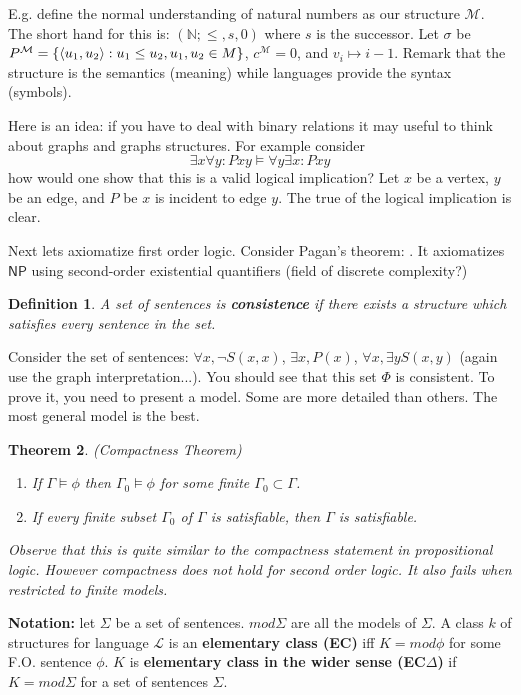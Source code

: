 \documentclass[twoside]{article}
\newcounter{lecnum}
\newtheorem{theorem}{Theorem}[lecnum]
\newtheorem{definition}[theorem]{Definition}
\def\N{\mathbb{N}}
\def\L{\mathcal{L}}
\def\M{\mathcal{M}}
\DeclarePairedDelimiter\anglebrac{\langle}{\rangle}
\begin{document}
E.g. define the normal understanding of natural numbers as our structure $\M$. The short hand for this is: $(\N ; \leq, s, 0)$ where $s$ is the successor. Let $\sigma$ be $P^{ \M } = \{\anglebrac{u_1, u_2}: u_1 \leq u_2, u_1, u_2 \in M\}$, $c^{\M} = 0$, and $v_i \mapsto i-1$. Remark that the structure is the semantics (meaning) while languages provide the syntax (symbols). 

Here is an idea: if you have to deal with binary relations it may useful to think about graphs and graphs structures. For example consider 
\[\exists x \forall y: Pxy \vDash \forall y \exists x: Pxy\]
how would one show that this is a valid logical implication? Let $x$ be a vertex, $y$ be an edge, and $P$ be $x$ is incident to edge $y$. The true of the logical implication is clear.   

Next lets axiomatize first order logic. Consider Pagan's theorem: . It axiomatizes $\mathsf{NP}$ using second-order existential quantifiers (field of discrete complexity?)

\begin{definition}
A set of sentences is \textbf{consistence} if there exists a structure which satisfies every sentence in the set. 
\end{definition}  

Consider the set of sentences: $\forall x, \lnot S(x,x)$, $\exists x, P(x)$, $\forall x, \exists y S(x,y)$ (again use the graph interpretation...). You should see that this set $\Phi$ is consistent. To prove it, you need to present a model. Some are more detailed than others. The most general model is the best.

\begin{theorem}
(Compactness Theorem)
\begin{enumerate}
\item If $\Gamma \vDash \phi$ then $\Gamma_0 \vDash \phi$ for some finite $\Gamma_0 \subset \Gamma$.
\item If every finite subset $\Gamma_0$ of $\Gamma$ is satisfiable, then $\Gamma$ is satisfiable.
\end{enumerate} 
Observe that this is quite similar to the compactness statement in propositional logic. However compactness does not hold for second order logic. It also fails when restricted to finite models.  
\end{theorem}

\textbf{Notation:} let $\Sigma$ be a set of sentences. $mod \Sigma$ are all the models of $\Sigma$. A class $k$ of structures for language $\L$ is an \textbf{elementary class (EC)} iff $K = mod \phi$ for some F.O. sentence $\phi$. $K$ is \textbf{elementary class in the wider sense (EC$\Delta$)} if $K = mod \Sigma$ for a set of sentences $\Sigma$.
\end{document}

